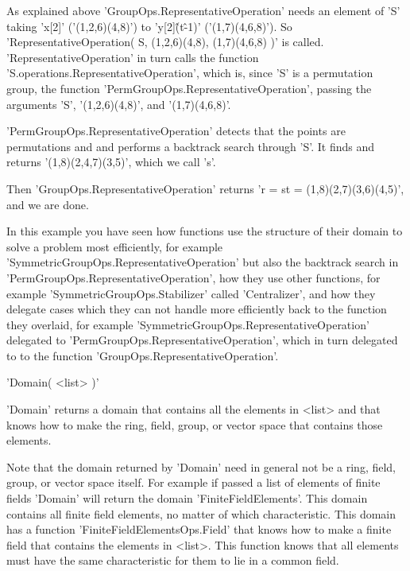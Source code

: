 As explained above 'GroupOps.RepresentativeOperation' needs an element of
'S' taking 'x[2]'  ('(1,2,6)(4,8)') to 'y[2]\^(t\^-1)'  ('(1,7)(4,6,8)').
So 'RepresentativeOperation( S, (1,2,6)(4,8), (1,7)(4,6,8) )' is  called.
'RepresentativeOperation'     in     turn     calls     the      function
'S.operations.RepresentativeOperation',  which   is,  since   'S'   is  a
permutation group,  the function  'PermGroupOps.RepresentativeOperation',
passing the arguments 'S', '(1,2,6)(4,8)', and '(1,7)(4,6,8)'.

'PermGroupOps.RepresentativeOperation'  detects  that  the   points   are
permutations and and  performs a backtrack search through 'S'.   It finds
and returns '(1,8)(2,4,7)(3,5)', which we call 's'.

Then   'GroupOps.RepresentativeOperation'    returns   'r    =   s\*t   =
(1,8)(2,7)(3,6)(4,5)', and we are done.

In this  example you have seen how functions use the  structure of  their
domain   to   solve   a    problem   most   efficiently,   for    example
'SymmetricGroupOps.RepresentativeOperation' but also the backtrack search
in 'PermGroupOps.RepresentativeOperation', how they use  other functions,
for example 'SymmetricGroupOps.Stabilizer' called 'Centralizer', and  how
they delegate cases  which they  can not handle  more efficiently back to
the       function        they        overlaid,        for        example
'SymmetricGroupOps.RepresentativeOperation'         delegated          to
'PermGroupOps.RepresentativeOperation', which in turn delegated to to the
function 'GroupOps.RepresentativeOperation'.


'Domain( <list> )'

'Domain' returns a domain that  contains all  the elements  in <list> and
that  knows how to  make  the ring,  field, group, or vector  space  that
contains those elements.

Note that the domain returned by 'Domain' need in general  not be a ring,
field, group,  or vector space itself.  For  example if passed  a list of
elements of  finite     fields 'Domain'   will     return   the    domain
'FiniteFieldElements'.  This  domain contains all finite  field elements,
no   matter  of  which  characteristic.  This   domain  has  a   function
'FiniteFieldElementsOps.Field' that knows how to make a finite field that
contains the elements in <list>.  This  function knows that  all elements
must have the same characteristic for them to lie in a common field.

